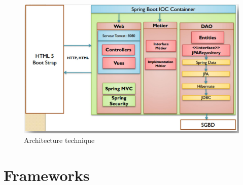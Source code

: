 \documentclass[12pt,a4paper]{report}
\begin{document}
		\begin{figure}[!hbtp]
			\centering
			\includegraphics[scale=0.5]{./graphics/architecture_tech.png}
			\caption{Architecture technique}
		\end{figure}
		\newpage
		
	\section{Frameworks}
\end{document}
